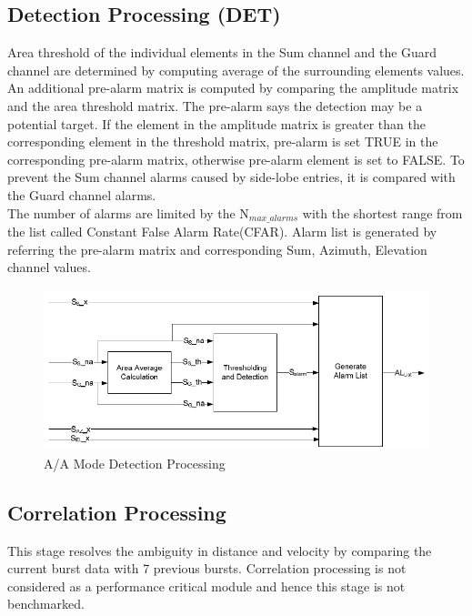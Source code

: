 \subsection{Detection Processing (DET)}
Area threshold of the individual elements in the Sum channel and the Guard channel are determined by computing average of the surrounding elements values. An additional pre-alarm matrix is computed by comparing the amplitude matrix and the area threshold matrix. The pre-alarm says the detection may be a potential target. If the element in the amplitude matrix is greater than the corresponding element in the threshold matrix, pre-alarm is set TRUE in the corresponding pre-alarm matrix, otherwise pre-alarm element is set to FALSE. To prevent the Sum channel alarms caused by side-lobe entries, it is compared with the Guard channel alarms. \\The number of alarms are limited by the N$_{max\_alarms}$ with the shortest range from the list called Constant False Alarm Rate(CFAR). Alarm list is generated by referring the pre-alarm matrix and corresponding Sum, Azimuth, Elevation channel values.\\

\begin{figure}[h!]
	\centering
	\includegraphics[width=140mm]{figures/aa_det}
	\caption{A/A Mode Detection Processing}
	\label{fig:bg_related_work:aa_det}
\end{figure}

\subsection{Correlation Processing}
This stage resolves the ambiguity in distance and velocity by comparing the current burst data with 7 previous bursts. Correlation processing is not considered as a performance critical module and hence this stage is not benchmarked. 

